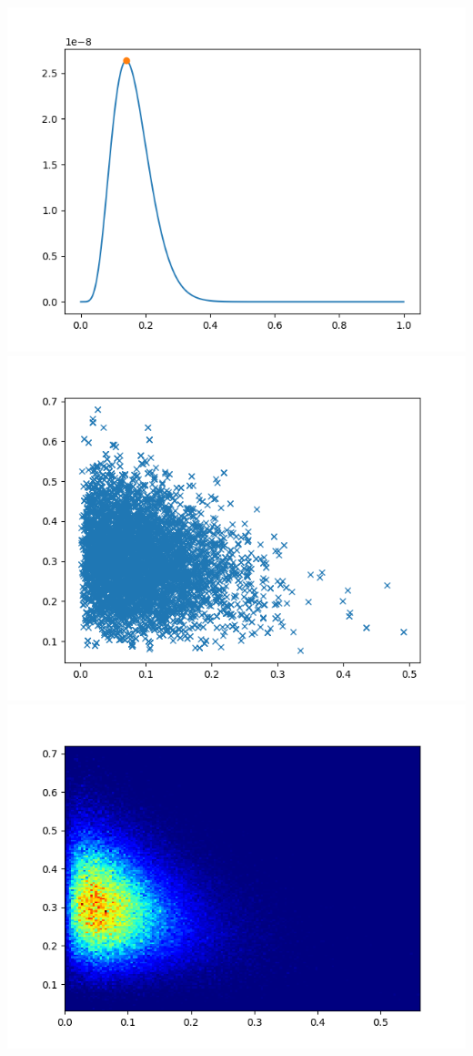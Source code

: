 \documentclass[pt12]{article}
\begin{document}
\newpage

\begin{center}
\includegraphics[scale=0.5]{hip5.png}\\
\includegraphics[scale=0.5]{sc5.png}\\
\includegraphics[scale=0.5]{den5.png}\\
\end{center}
\end{document}
